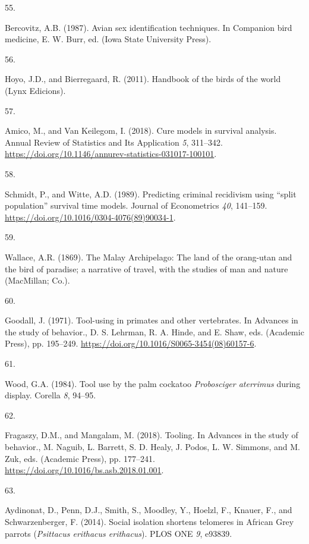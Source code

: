 \documentclass[
  man, donotrepeattitle,floatsintext]{apa6}
\newlength{\cslhangindent}
\newlength{\csllabelwidth}
\newlength{\cslentryspacingunit} %
\newenvironment{CSLReferences}[2] %
 {%
  \setlength{\parindent}{0pt}
  \ifodd #1
  \let\oldpar\par
  \def\par{\hangindent=\cslhangindent\oldpar}
  \fi
  \setlength{\parskip}{#2\cslentryspacingunit}
 }%
 {}
\newcommand{\CSLLeftMargin}[1]{\parbox[t]{\csllabelwidth}{#1}}
\newcommand{\CSLRightInline}[1]{\parbox[t]{\linewidth - \csllabelwidth}{#1}\break}
\begin{document}
\begin{CSLReferences}{0}{0}
\leavevmode{}%
\CSLLeftMargin{55. }%
\CSLRightInline{Bercovitz, A.B. (1987). Avian sex identification techniques. In Companion bird medicine, E. W. Burr, ed. (Iowa State University Press).}

\leavevmode{}%
\CSLLeftMargin{56. }%
\CSLRightInline{Hoyo, J.D., and Bierregaard, R. (2011). Handbook of the birds of the world (Lynx Edicions).}

\leavevmode{}%
\CSLLeftMargin{57. }%
\CSLRightInline{Amico, M., and Van Keilegom, I. (2018). Cure models in survival analysis. Annual Review of Statistics and Its Application \emph{5}, 311--342. \url{https://doi.org/10.1146/annurev-statistics-031017-100101}.}

\leavevmode{}%
\CSLLeftMargin{58. }%
\CSLRightInline{Schmidt, P., and Witte, A.D. (1989). Predicting criminal recidivism using {``split population''} survival time models. Journal of Econometrics \emph{40}, 141--159. \url{https://doi.org/10.1016/0304-4076(89)90034-1}.}

\leavevmode{}%
\CSLLeftMargin{59. }%
\CSLRightInline{Wallace, A.R. (1869). The {M}alay {A}rchipelago: The land of the orang-utan and the bird of paradise; a narrative of travel, with the studies of man and nature (MacMillan; Co.).}

\leavevmode{}%
\CSLLeftMargin{60. }%
\CSLRightInline{Goodall, J. (1971). Tool-using in primates and other vertebrates. In Advances in the study of behavior., D. S. Lehrman, R. A. Hinde, and E. Shaw, eds. (Academic Press), pp. 195--249. \url{https://doi.org/10.1016/S0065-3454(08)60157-6}.}

\leavevmode{}%
\CSLLeftMargin{61. }%
\CSLRightInline{Wood, G.A. (1984). Tool use by the palm cockatoo \emph{{P}robosciger aterrimus} during display. Corella \emph{8}, 94--95.}

\leavevmode{}%
\CSLLeftMargin{62. }%
\CSLRightInline{Fragaszy, D.M., and Mangalam, M. (2018). Tooling. In Advances in the study of behavior., M. Naguib, L. Barrett, S. D. Healy, J. Podos, L. W. Simmons, and M. Zuk, eds. (Academic Press), pp. 177--241. \url{https://doi.org/10.1016/bs.asb.2018.01.001}.}

\leavevmode{}%
\CSLLeftMargin{63. }%
\CSLRightInline{Aydinonat, D., Penn, D.J., Smith, S., Moodley, Y., Hoelzl, F., Knauer, F., and Schwarzenberger, F. (2014). Social isolation shortens telomeres in {A}frican {G}rey parrots (\emph{{P}sittacus erithacus erithacus}). PLOS ONE \emph{9}, e93839.}


\end{CSLReferences}
\end{document}
